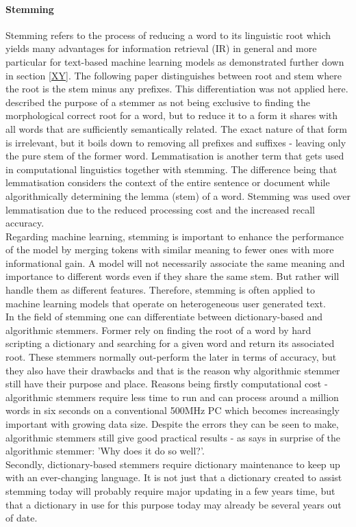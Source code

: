 \paragraph*{Stemming} \label{word_stemming}
Stemming refers to the process of reducing a word to its linguistic root which yields many advantages for information retrieval (IR) in general and more particular for text-based machine learning models as demonstrated further down in section \ref{XY}. The following paper \parencite{Lovins1968} distinguishes between root and stem where the root is the stem minus any prefixes. This differentiation was not applied here. 
\parencite{Weissweiler2018} described the purpose of a stemmer as not being exclusive to finding the morphological correct root for a word, but to reduce it to a form it shares with all words that are sufficiently semantically related. The exact nature of that form is irrelevant, but it boils down to removing all prefixes and suffixes - leaving only the pure stem of the former word. Lemmatisation is another term that gets used in computational linguistics together with stemming. The difference being that lemmatisation considers the context of the entire sentence or document while algorithmically determining the lemma (stem) of a word. Stemming was used over lemmatisation due to the reduced processing cost and the increased recall accuracy.\\
\newline
Regarding machine learning, stemming is important to enhance the performance of the model by merging tokens with similar meaning to fewer ones with more informational gain. A model will not necessarily associate the same meaning and importance to different words even if they share the same stem. But rather will handle them as different features. Therefore, stemming is often applied to machine learning models that operate on heterogeneous user generated text.\\
\newline
In the field of stemming one can differentiate between dictionary-based and algorithmic stemmers. Former rely on finding the root of a word by hard scripting a dictionary and searching for a given word and return its associated root. These stemmers normally out-perform the later in terms of accuracy, but they also have their drawbacks and that is the reason why algorithmic stemmer still have their purpose and place.  Reasons being firstly computational cost - algorithmic stemmers require less time to run and can process around a million words in six seconds on a conventional 500MHz PC \parencite{Porter2001} which becomes increasingly important with growing data size. Despite the errors they can be seen to make, algorithmic stemmers still give good practical results - as \parencite{Krovetz1995} says in surprise of the algorithmic stemmer: 'Why does it do so well?'.\\ Secondly, dictionary-based stemmers require dictionary maintenance to keep up with an ever-changing language. It is not just that a dictionary created to assist stemming today will probably require major updating in a few years time, but that a dictionary in use for this purpose today may already be several years out of date.\\
